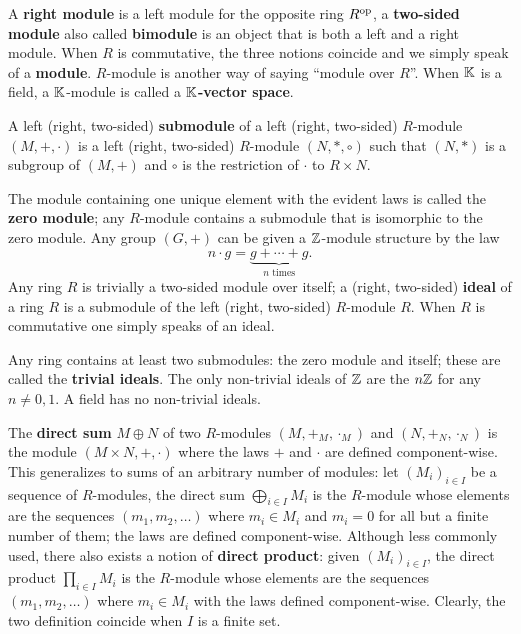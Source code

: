 A \textbf{right module} is a left module
for the opposite ring $R^{\mathrm{op}}$, a
\textbf{two-sided module} also called
\textbf{bimodule} is an object that is both a left and
a right module. When $R$ is commutative, the three notions coincide
and we simply speak of a \textbf{module}.  $R$-module is
another way of saying ``module over $R$''. When $\mathbb{K}$ is a field, a
$\mathbb{K}$-module is called a \textbf{$\mathbb{K}$-vector
  space}.

A left
(right,
two-sided) \textbf{submodule} of a left
(right, two-sided) $R$-module $(M,+,\cdot)$ is a left (right, two-sided)
$R$-module $(N,\ast,\circ)$ such that $(N,\ast)$ is a subgroup of
$(M,+)$ and $\circ$ is the restriction of $\cdot$ to $R\times N$.

The module containing one unique element with the evident laws is
called the \textbf{zero module}; any
$R$-module contains a submodule that is isomorphic to the zero
module. Any group $(G,+)$ can be given a $\mathbb{Z}$-module structure by the
law
\[n\cdot g = \underbrace{g + \cdots + g}_{n\text{ times}} \text{.}\]
Any ring $R$ is trivially a two-sided module over itself; a
 (right,
two-sided) \textbf{ideal} of a ring $R$ is a
submodule of the left (right, two-sided) $R$-module $R$.  When $R$ is
commutative one simply speaks of an ideal.  

Any ring contains at least two submodules: the zero module and itself;
these are called the \textbf{trivial ideals}. The
only non-trivial ideals of $\mathbb{Z}$ are the $n\mathbb{Z}$ for any $n\ne0,1$. A
field has no non-trivial ideals.

The \textbf{direct sum} $M\oplus N$ of two
$R$-modules $(M,+_M,\cdot_M)$ and $(N,+_N,\cdot_N)$ is the module
$(M\times N,+,\cdot)$ where the laws $+$ and $\cdot$ are defined
component-wise. This generalizes to sums of an arbitrary number of
modules: let $(M_i)_{i\in I}$ be a sequence of $R$-modules, the direct
sum $\bigoplus_{i\in I}M_i$ is the $R$-module whose elements are the
sequences $(m_1,m_2,\ldots)$ where $m_i\in M_i$ and $m_i=0$ for all
but a finite number of them; the laws are defined component-wise.
Although less commonly used, there also exists a notion of
\textbf{direct product}: given $(M_i)_{i\in I}$,
the direct product $\prod_{i\in I}M_i$ is the $R$-module whose
elements are the sequences $(m_1,m_2,\ldots)$ where $m_i\in M_i$ with
the laws defined component-wise. Clearly, the two definition coincide
when $I$ is a finite set.

